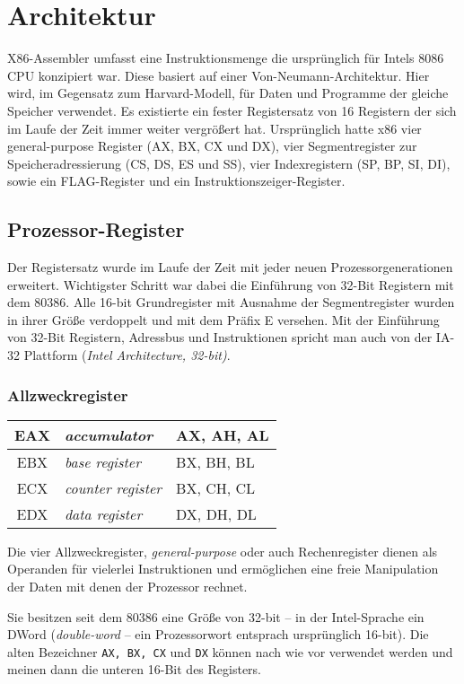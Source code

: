 \section{Architektur}
X86-Assembler umfasst eine Instruktionsmenge die ursprünglich für Intels 8086 CPU konzipiert war. Diese basiert auf einer Von-Neumann-Architektur. Hier wird, im Gegensatz zum Harvard-Modell, für Daten und Programme der gleiche Speicher verwendet. Es existierte ein fester Registersatz von 16 Registern der sich im Laufe der Zeit immer weiter vergrößert hat. Ursprünglich hatte x86 vier general-purpose Register (AX, BX, CX und DX), vier Segmentregister zur Speicheradressierung (CS, DS, ES und SS), vier Indexregistern (SP, BP, SI, DI), sowie ein FLAG-Register und ein Instruktionszeiger-Register.

\subsection{Prozessor-Register}

Der Registersatz wurde im Laufe der Zeit mit jeder neuen Prozessorgenerationen erweitert. Wichtigster Schritt war dabei die Einführung von 32-Bit Registern mit dem 80386. Alle 16-bit Grundregister mit Ausnahme der Segmentregister wurden in ihrer Größe verdoppelt und mit dem Präfix E versehen. Mit der Einführung von 32-Bit Registern, Adressbus und Instruktionen spricht man auch von der IA-32 Plattform (\emph{Intel Architecture, 32-bit)}.

\subsubsection{Allzweckregister}

\begin{tabular}{|c|l|l|}
\hline EAX & \emph{accumulator} & AX, AH, AL \\
\hline EBX & \emph{base register} & BX, BH, BL \\
\hline ECX & \emph{counter register} & BX, CH, CL \\
\hline EDX & \emph{data register} & DX, DH, DL \\
\hline \end{tabular}

Die vier Allzweckregister, \emph{general-purpose} oder auch Rechenregister dienen als Operanden für vielerlei Instruktionen und ermöglichen eine freie Manipulation der Daten mit denen der Prozessor rechnet.

Sie besitzen seit dem 80386 eine Größe von 32-bit – in der Intel-Sprache ein DWord (\emph{double-word} -- ein Prozessorwort entsprach ursprünglich 16-bit). Die alten Bezeichner {\tt AX, BX, CX} und {\tt DX} können nach wie vor verwendet werden und meinen dann die unteren 16-Bit des Registers.

